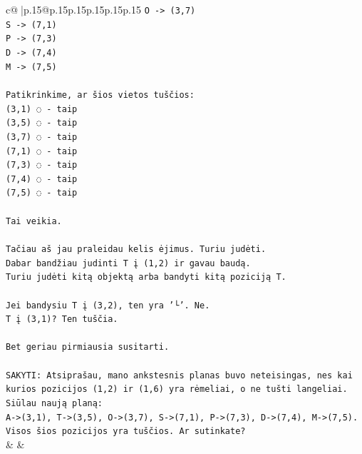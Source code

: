 \documentclass{article}
\begin{document}
{\begin{supertabular}{c@{$\;$}|p{.15\linewidth}@{}p{.15\linewidth}p{.15\linewidth}p{.15\linewidth}p{.15\linewidth}p{.15\linewidth}}
{{{\texttt{O {-}> (3,7)} \\
\texttt{S {-}> (7,1)} \\
\texttt{P {-}> (7,3)} \\
\texttt{D {-}> (7,4)} \\
\texttt{M {-}> (7,5)} \\
\\ 
\texttt{Patikrinkime, ar šios vietos tuščios:} \\
\texttt{(3,1) ◌ {-} taip} \\
\texttt{(3,5) ◌ {-} taip} \\
\texttt{(3,7) ◌ {-} taip} \\
\texttt{(7,1) ◌ {-} taip} \\
\texttt{(7,3) ◌ {-} taip} \\
\texttt{(7,4) ◌ {-} taip} \\
\texttt{(7,5) ◌ {-} taip} \\
\\ 
\texttt{Tai veikia.} \\
\\ 
\texttt{Tačiau aš jau praleidau kelis ėjimus. Turiu judėti.} \\
\texttt{Dabar bandžiau judinti T į (1,2) ir gavau baudą.} \\
\texttt{Turiu judėti kitą objektą arba bandyti kitą poziciją T.} \\
\\ 
\texttt{Jei bandysiu T į (3,2), ten yra '└'. Ne.} \\
\texttt{T į (3,1)? Ten tuščia.} \\
\\ 
\texttt{Bet geriau pirmiausia susitarti.} \\
\\ 
\texttt{SAKYTI: Atsiprašau, mano ankstesnis planas buvo neteisingas, nes kai kurios pozicijos (1,2) ir (1,6) yra rėmeliai, o ne tušti langeliai. Siūlau naują planą:} \\
\texttt{A{-}>(3,1), T{-}>(3,5), O{-}>(3,7), S{-}>(7,1), P{-}>(7,3), D{-}>(7,4), M{-}>(7,5).} \\
\texttt{Visos šios pozicijos yra tuščios. Ar sutinkate?} \\
            }
        }
    }
    & & \\ \\


\end{supertabular}}
\end{document}
